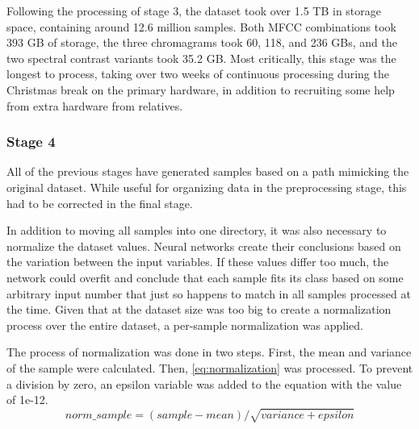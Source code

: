Following the processing of stage 3, the dataset took over 1.5 TB in storage space, containing around 12.6 million samples.
Both MFCC combinations took 393 GB of storage, the three chromagrams took 60, 118, and 236 GBs, and the two spectral contrast variants took 35.2 GB.
Most critically, this stage was the longest to process, taking over two weeks of continuous processing during the Christmas break on the primary hardware, in addition to recruiting some help from extra hardware from relatives.

\subsubsection{Stage 4}
All of the previous stages have generated samples based on a path mimicking the original dataset.
While useful for organizing data in the preprocessing stage, this had to be corrected in the final stage.

In addition to moving all samples into one directory, it was also necessary to normalize the dataset values.
Neural networks create their conclusions based on the variation between the input variables.
If these values differ too much, the network could overfit and conclude that each sample fits its class based on some arbitrary input number that just so happens to match in all samples processed at the time.
Given that at the dataset size was too big to create a normalization process over the entire dataset, a per-sample normalization was applied.

The process of normalization was done in two steps.
First, the mean and variance of the sample were calculated.
Then, \cref{eq:normalization} was processed.
To prevent a division by zero, an epsilon variable was added to the equation with the value of 1e-12.
\begin{equation}
    norm\_sample = (sample - mean) / \sqrt{variance + epsilon}
    \label{eq:normalization}
\end{equation}

